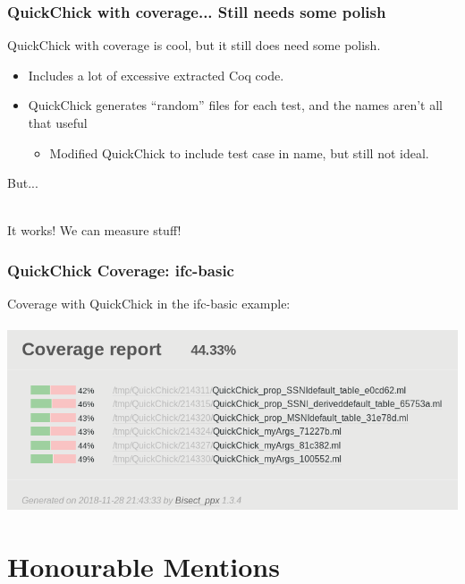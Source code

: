 \documentclass{beamer}
\begin{document}
\begin{frame}
  \frametitle{QuickChick with coverage... Still needs some polish}

  QuickChick with coverage is cool, but it still does need some
  polish.\\

  \begin{itemize}
    \pause
  \item Includes a lot of excessive extracted Coq code.
    \pause
  \item QuickChick generates ``random'' files for each test, and the
    names aren't all that useful
    \begin{itemize}
    \item Modified QuickChick to include test case in name, but still
      not ideal.
    \end{itemize}
  \end{itemize}

  \pause

  But...\\~\\

  \pause

  {\huge It works! We can measure stuff!}
\end{frame}

\begin{frame}
  \frametitle{QuickChick Coverage: ifc-basic}

  Coverage with QuickChick in the ifc-basic example: \\~\\

  \includegraphics[width=\textwidth]{ifccoverage.png} \\
  
\end{frame}

\section{Honourable Mentions}
\end{document}
